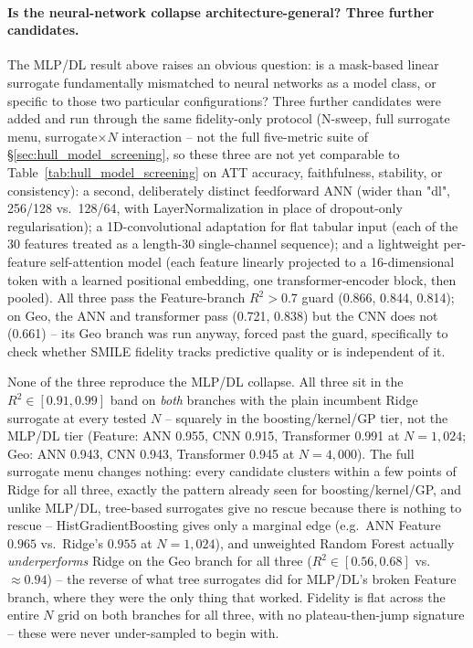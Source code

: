 \paragraph{Is the neural-network collapse architecture-general? Three further
candidates.} The MLP/DL result above raises an obvious question: is a
mask-based linear surrogate fundamentally mismatched to neural networks as a
model class, or specific to those two particular configurations? Three
further candidates were added and run through the same fidelity-only
protocol (N-sweep, full surrogate menu, surrogate$\times N$ interaction --
not the full five-metric suite of \S\ref{sec:hull_model_screening}, so these
three are not yet comparable to Table~\ref{tab:hull_model_screening} on ATT
accuracy, faithfulness, stability, or consistency): a second, deliberately
distinct feedforward ANN (wider than "dl", 256/128 vs.\ 128/64, with
LayerNormalization in place of dropout-only regularisation); a 1D-convolutional
adaptation for flat tabular input (each of the 30 features treated as a
length-30 single-channel sequence); and a lightweight per-feature
self-attention model (each feature linearly projected to a 16-dimensional
token with a learned positional embedding, one transformer-encoder block,
then pooled). All three pass the Feature-branch $R^2>0.7$ guard (0.866,
0.844, 0.814); on Geo, the ANN and transformer pass (0.721, 0.838) but the
CNN does not (0.661) -- its Geo branch was run anyway, forced past the
guard, specifically to check whether SMILE fidelity tracks predictive
quality or is independent of it.

None of the three reproduce the MLP/DL collapse. All three sit in the
$R^2\in[0.91,0.99]$ band on \emph{both} branches with the plain incumbent
Ridge surrogate at every tested $N$ -- squarely in the boosting/kernel/GP
tier, not the MLP/DL tier (Feature: ANN 0.955, CNN 0.915, Transformer 0.991
at $N{=}1{,}024$; Geo: ANN 0.943, CNN 0.943, Transformer 0.945 at
$N{=}4{,}000$). The full surrogate menu changes nothing: every candidate
clusters within a few points of Ridge for all three, exactly the pattern
already seen for boosting/kernel/GP, and unlike MLP/DL, tree-based
surrogates give no rescue because there is nothing to rescue --
HistGradientBoosting gives only a marginal edge (e.g.\ ANN Feature $0.965$ vs.\
Ridge's $0.955$ at $N{=}1{,}024$), and unweighted Random Forest actually
\emph{underperforms} Ridge on the Geo branch for all three ($R^2\in
[0.56,0.68]$ vs.\ $\approx0.94$) -- the reverse of what tree surrogates did
for MLP/DL's broken Feature branch, where they were the only thing that
worked. Fidelity is flat across the entire $N$ grid on both branches for all
three, with no plateau-then-jump signature -- these were never
under-sampled to begin with.

